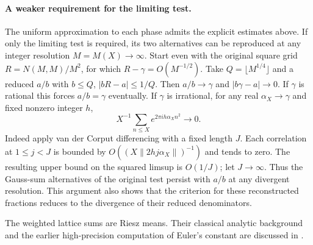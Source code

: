 \documentclass[11pt,a4paper,oneside,openany]{report}
\theoremstyle{remark}\newtheorem{remark}[theorem]{Remark}
\numberwithin{equation}{section}
\begin{document}
\paragraph{A weaker requirement for the limiting test.}
The uniform approximation to each phase admits the explicit estimates
above. If only the limiting test is required, its two alternatives
can be reproduced at any integer resolution $M=M(X)\to\infty$.
Start even with the original square grid $R=N(M,M)/M^2$, for which
$R-\gamma=O(M^{-1/2})$. Take $Q=\lfloor M^{1/4}\rfloor$ and a
reduced $a/b$ with $b\le Q$, $|bR-a|\le 1/Q$.
Then $a/b\to\gamma$ and $|b\gamma-a|\to0$. If $\gamma$ is rational
this forces $a/b=\gamma$ eventually. If $\gamma$ is irrational,
for any real $\alpha_X\to\gamma$ and fixed nonzero integer $h$,
\[
  X^{-1}\sum_{n\le X}e^{2\pi i h\alpha_X n^2}\longrightarrow0 .
\]
Indeed apply van der Corput differencing with a fixed length $J$.
Each correlation at $1\le j<J$ is bounded by
$O((X\|2hj\alpha_X\|)^{-1})$ and tends to zero.
The resulting upper bound on the squared limsup is $O(1/J)$;
let $J\to\infty$. Thus the Gauss-sum alternatives of the original
test persist with $a/b$ at any divergent resolution. This argument
also shows that the criterion for these reconstructed fractions
reduces to the divergence of their reduced denominators.

The weighted lattice sums are Riesz means. Their classical analytic background and the earlier high-precision computation of Euler's constant are discussed in \cite{bkz,brent}.
\end{document}
